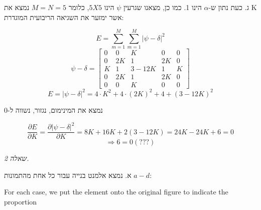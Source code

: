 \documentclass[a4paper]{iacas}
\begin{document}
\begin{hebrew}
ג. כעת נתון ש-$\alpha$ הינו 1. כמו כן, מצאנו שגרעין $\psi$ הינו $5X5$, כלומר $M=N=5$ נמצא את K אשר ימזער את השגיאה הריבועית המוגדרת:
\end{hebrew}
\begin{equation*}
E = \sum_{m=1}^M \sum_{m=1}^M |\psi -\delta|^2
\end{equation*}
\begin{equation*}
\psi -\delta  = \begin{bmatrix}0&0&K&0&0\\0&2K&1&2K&0\\K&1&3-12K&1&K\\0&2K&1&2K&0\\0&0&K&0&0\end{bmatrix}
\end{equation*}
\begin{equation*}
E = |\psi -\delta|^2 = 4\cdot K^2 + 4\cdot (2K)^2 + 4 + (3-12K)^2
\end{equation*}
\begin{hebrew}
נמצא את המינימום, נגזור, נשווה ל-0
\end{hebrew}
\begin{equation*}
\frac{\partial E}{\partial K} = \frac{\partial{|\psi -\delta|^2}}{\partial K} = 8K + 16K + 2(3-12K) = 24K -24K + 6 = 0
\end{equation*}
\begin{equation*}
\Longrightarrow 6 = 0 (???)
\end{equation*}


\newpage

\begin{hebrew}
\textit{\huge שאלה 2.}

א. נמצא אלמנט בנייה עבור כל אחת מהתמונות $a-d$:
\end{hebrew}

For each case, we put the element onto the original figure to indicate the proportion
\end{document}
